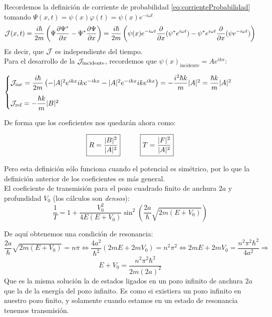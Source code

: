 \documentclass{report}
\begin{document}
{          Recordemos la definición de corriente de probabilidad \ref{eq:corrienteProbabilidad}
          tomando $\Psi(x,t)=\psi(x)\varphi(t)=\psi(x)e^{-i\omega t}$
          \[\mathcal{J}(x,t)=\dfrac{i\hbar}{2m}\left(\Psi\dfrac{\partial\Psi^*}{\partial x}-\Psi^*\dfrac{\partial \Psi}
          {\partial x}\right) = \dfrac{i\hbar}{2m}\left(\psi(x)e^{-i\omega t} 
          \dfrac{\partial}{\partial x}(\psi^*e^{i\omega t})-\psi^*e^{i\omega t}
          \dfrac{\partial}{\partial x}(\psi e^{-i\omega t})\right)\]
          Es decir, que $\mathcal{J}$ es independiente del tiempo.\\

          Para el desarrollo de la $\mathcal{J}_{\text{incidente}}$, recordemos
          que $\psi(x)_{\text{incidente}}=Ae^{ikx}$:

          $\begin{cases}
            \mcJ_{\text{inc}}=\dfrac{i\hbar}{2m}\left(-\abs{A}^2
            e^{ikx}ike^{-ikx}-\abs{A}^2e^{-ikx}ike^{ikx}\right)=
            -\dfrac{i^2\hbar k}{m}\abs{A}^2=\dfrac{\hbar k}{m}\abs{A}^2\vspace{0.3cm}\\

            \mcJ_{\text{ref}}=-\dfrac{\hbar k}{m}\abs{B}^2
          \end{cases}$

          De forma que los coeficientes nos quedarán ahora como:

          \[\boxed{R=\dfrac{\lvert B\rvert^2}{\lvert A\rvert^2}}\hspace{1cm}
          \boxed{T=\dfrac{\lvert F\rvert^2}{\lvert A\rvert^2}}\]

          Pero esta definición sólo funciona cuando el potencial es 
          simétrico, por lo que la definición anterior de los coeficientes
          es más general.\\

          El coeficiente de transmisión para el pozo cuadrado finito de 
          anchura $2a$ y profundidad $V_0$ (los cálculos son \textit{densos}):
          \[\boxed{\dfrac{1}{T}=1+\dfrac{V_0^2}{4E(E+V_0)}\sin^2\left(
          \dfrac{2a}{\hbar}\sqrt{2m(E+V_0)}\right)}\]


          De aquí obtenemos una condición de resonancia:\\ 
          $\dfrac{2a}{\hbar}\sqrt{2m(E+V_0)}=n\pi\Longleftrightarrow
          \dfrac{4a^2}{\hbar^2}(2mE+2mV_0)=n^2\pi^2\Longleftrightarrow
          2mE+2mV_0=\dfrac{n^2\pi^2\hbar^2}{4a^2}\Longrightarrow$
          \[E+V_0=\dfrac{n^2\pi^2\hbar^2}{2m(2a)^2}\]
          Que es la misma solución la de estados ligados en un pozo infinito
          de anchura $2a$ que la de la energía del pozo infinito.
          Es como si existiera un pozo infinito en nuestro pozo finito, y 
          solamente cuando estamos en un estado de resonancia tenemos transmisión.
        }
\end{document}

